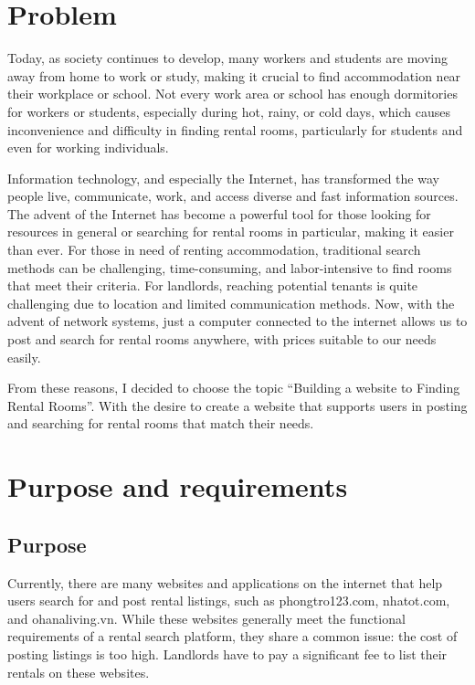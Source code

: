 \documentclass[../Main.tex]{subfiles}
\begin{document}
\section{Problem}
\label{sec:problem}

Today, as society continues to develop, many workers and students are moving away from home to work or study, making it crucial to find accommodation near their workplace or school.
Not every work area or school has enough dormitories for workers or students, especially during hot, rainy, or cold days, which causes inconvenience and difficulty in finding rental rooms, particularly for students and even for working individuals.

Information technology, and especially the Internet, has transformed the way people live, communicate, work, and access diverse and fast information sources.
The advent of the Internet has become a powerful tool for those looking for resources in general or searching for rental rooms in particular, making it easier than ever.
For those in need of renting accommodation, traditional search methods can be challenging, time-consuming, and labor-intensive to find rooms that meet their criteria.
For landlords, reaching potential tenants is quite challenging due to location and limited communication methods.
Now, with the advent of network systems, just a computer connected to the internet allows us to post and search for rental rooms anywhere, with prices suitable to our needs easily.

From these reasons, I decided to choose the topic ``Building a website to Finding Rental Rooms''.
With the desire to create a website that supports users in posting and searching for rental rooms that match their needs.

\section{Purpose and requirements}
\label{sec:purpose}

\subsection{Purpose}

Currently, there are many websites and applications on the internet that help users search for and post rental listings, such as phongtro123.com, nhatot.com, and ohanaliving.vn.
While these websites generally meet the functional requirements of a rental search platform, they share a common issue: the cost of posting listings is too high.
Landlords have to pay a significant fee to list their rentals on these websites.
\end{document}
